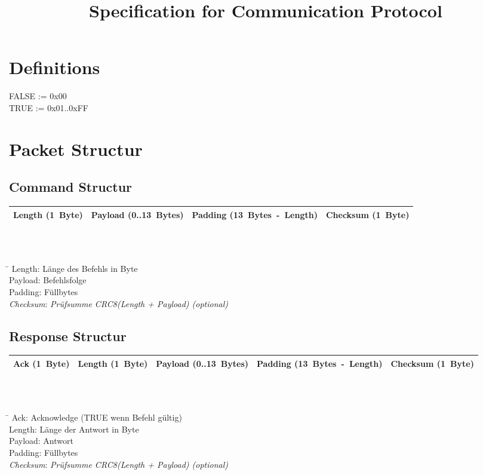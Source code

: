 \documentclass[10pt,a4paper]{article}
\title{Specification for Communication Protocol}
\author{}
\date{}
\begin{document}
\maketitle
\tableofcontents
\section*{Definitions}
FALSE := 0x00\\
TRUE := 0x01..0xFF\\

\section{Packet Structur}
\subsection{Command Structur}
\begin{tabular}{|p{1.5cm}|p{2.2cm}|p{3.2cm}|p{2cm}|}
	\hline 
	Length \mbox{(1 Byte)} & 
	Payload \mbox{(0..13 Bytes)} & 
	Padding \mbox{(13 Bytes - Length)} & 
	Checksum \mbox{(1 Byte)} \\
	\hline 
\end{tabular}  
\\\\
\begin{tabbing}
	\hspace*{2cm} \= \kill
	Length:  \>Länge des Befehls in Byte\\
	Payload: \>Befehlsfolge\\
	Padding: \>Füllbytes\\
	\textit{Checksum}: \>\textit{Prüfsumme CRC8(Length + Payload) (optional)}\\
\end{tabbing}

\subsection{Response Structur} 
\begin{tabular}{|p{1.5cm}|p{1.5cm}|p{2.2cm}|p{3.2cm}|p{2cm}|}
	\hline 
	Ack \mbox{(1 Byte)} &
	Length \mbox{(1 Byte)} & 
	Payload \mbox{(0..13 Bytes)} & 
	Padding \mbox{(13 Bytes - Length)} & 
	Checksum \mbox{(1 Byte)} \\
	\hline 
\end{tabular}  
\\\\
\begin{tabbing}
	\hspace*{2cm} \= \kill
	Ack:	 \>Acknowledge (TRUE wenn Befehl gültig)\\
	Length:  \>Länge der Antwort in Byte\\
	Payload: \>Antwort\\
	Padding: \>Füllbytes\\
	\textit{Checksum}: \>\textit{Prüfsumme CRC8(Length + Payload) (optional)}\\
\end{tabbing}
\end{document}
